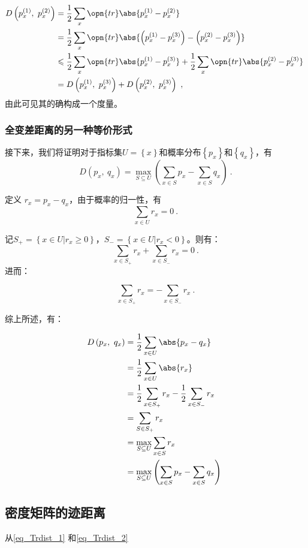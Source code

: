 \begin{equation}
\begin{aligned}
D\left(p_x^{(1)},~p_x^{(2)}\right) &= \frac{1}{2}\sum_x\opn{tr}\abs{p_x^{(1)} - p_x^{(2)}} \\
&= \frac{1}{2}\sum_x\opn{tr}\abs{\left(p_x^{(1)} - p_x^{(3)}\right) - \left(p_x^{(2)} - p_x^{(3)}\right)} \\
&\leqslant\frac{1}{2}\sum_x\opn{tr}\abs{p_x^{(1)} - p_x^{(3)}} + \frac{1}{2}\sum_x\opn{tr}\abs{p_x^{(2)} - p_x^{(3)}} \\
&=D\left(p_x^{(1)},~p_x^{(3)}\right)+D\left(p_x^{(2)},~p_x^{(3)}\right)~,
\end{aligned}~
\end{equation}
由此可见其的确构成一个度量。

\subsubsection{全变差距离的另一种等价形式}

接下来，我们将证明对于指标集$U = \left\{x\right\}$和概率分布$\left\{p_x\right\}$和$\left\{q_x\right\}$，有
\begin{equation}\label{eq_Trdist_2}
D\left(p_x,~q_x\right) = \max_{S \subseteq U}\left(\sum_{x\in S}p_x - \sum_{x\in S}q_x\right)~.
\end{equation}

定义 $r_x = p_x - q_x$，由于概率的归一性，有
\begin{equation}
\sum\limits_{x\in U}r_x = 0~.
\end{equation}


记$S_+ = \left\{x \in U | r_x \geqslant 0\right\}$，$S_- = \left\{x \in U | r_x < 0\right\}$。则有：
\begin{equation}
\sum_{x\in S_+}r_x + \sum_{x\in S_-}r_x = 0~.
\end{equation}
进而：

\begin{equation}
\sum_{x\in S_+}r_x = -\sum_{x\in S_-}r_x~.
\end{equation}

综上所述，有：

\begin{equation}
\begin{aligned}
D\left(p_x,~q_x\right) &= \frac{1}{2}\sum_{x\in U}\abs{p_x - q_x} \\
&= \frac{1}{2}\sum_{x\in U}\abs{r_x} \\
&= \frac{1}{2}\sum_{x\in S_+}r_x - \frac{1}{2}\sum_{x\in S_-}r_x \\
&= \sum_{S\in S_+}r_x \\
&= \max_{S \subseteq U}\sum_{x\in S}r_x \\
&= \max_{S\subseteq U}\left(\sum_{x\in S}p_x - \sum_{x\in S}q_x\right)
\end{aligned}~
\end{equation}

\subsection{密度矩阵的迹距离}

从\autoref{eq_Trdist_1} 和\autoref{eq_Trdist_2} 


